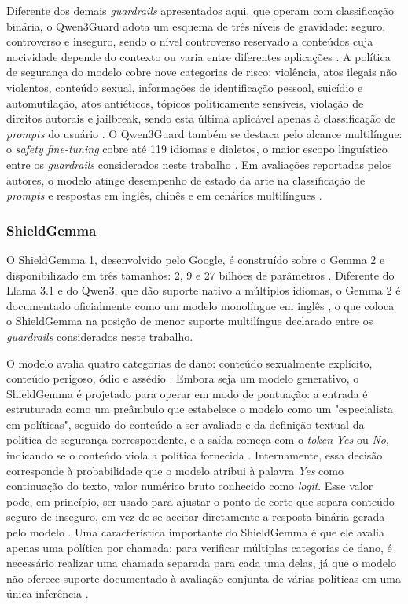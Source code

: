 Diferente dos demais \textit{guardrails} apresentados aqui, que operam com classificação binária, o Qwen3Guard adota um esquema de três níveis de gravidade: seguro, controverso e inseguro, sendo o nível controverso reservado a conteúdos cuja nocividade depende do contexto ou varia entre diferentes aplicações \cite{zhao2025qwen3guard}. A política de segurança do modelo cobre nove categorias de risco: violência, atos ilegais não violentos, conteúdo sexual, informações de identificação pessoal, suicídio e automutilação, atos antiéticos, tópicos politicamente sensíveis, violação de direitos autorais e jailbreak, sendo esta última aplicável apenas à classificação de \textit{prompts} do usuário \cite{zhao2025qwen3guard}. O Qwen3Guard também se destaca pelo alcance multilíngue: o \textit{safety fine-tuning} cobre até 119 idiomas e dialetos, o maior escopo linguístico entre os \textit{guardrails} considerados neste trabalho \cite{qwen3guardhf, zhao2025qwen3guard}. Em avaliações reportadas pelos autores, o modelo atinge desempenho de estado da arte na classificação de \textit{prompts} e respostas em inglês, chinês e em cenários multilíngues \cite{zhao2025qwen3guard}.

\subsubsection{ShieldGemma}
\label{subsec:shieldgemma}

O ShieldGemma 1, desenvolvido pelo Google, é construído sobre o Gemma 2 e disponibilizado em três tamanhos: 2, 9 e 27 bilhões de parâmetros \cite{zeng2024shieldgemma, shieldgemmahf}. Diferente do Llama 3.1 e do Qwen3, que dão suporte nativo a múltiplos idiomas, o Gemma 2 é documentado oficialmente como um modelo monolíngue em inglês \cite{gemma2modelcard}, o que coloca o ShieldGemma na posição de menor suporte multilíngue declarado entre os \textit{guardrails} considerados neste trabalho.

O modelo avalia quatro categorias de dano: conteúdo sexualmente explícito, conteúdo perigoso, ódio e assédio \cite{zeng2024shieldgemma}. Embora seja um modelo generativo, o ShieldGemma é projetado para operar em modo de pontuação: a entrada é estruturada como um preâmbulo que estabelece o modelo como um "especialista em políticas", seguido do conteúdo a ser avaliado e da definição textual da política de segurança correspondente, e a saída começa com o \textit{token} \textit{Yes} ou \textit{No}, indicando se o conteúdo viola a política fornecida \cite{shieldgemmahf}. Internamente, essa decisão corresponde à probabilidade que o modelo atribui à palavra \textit{Yes} como continuação do texto, valor numérico bruto conhecido como \textit{logit}. Esse valor pode, em princípio, ser usado para ajustar o ponto de corte que separa conteúdo seguro de inseguro, em vez de se aceitar diretamente a resposta binária gerada pelo modelo \cite{shieldgemmahf}. Uma característica importante do ShieldGemma é que ele avalia apenas uma política por chamada: para verificar múltiplas categorias de dano, é necessário realizar uma chamada separada para cada uma delas, já que o modelo não oferece suporte documentado à avaliação conjunta de várias políticas em uma única inferência \cite{shieldgemmahf}.

